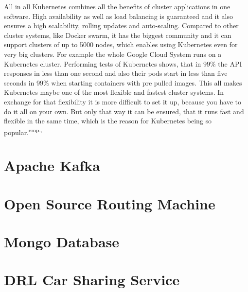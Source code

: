 All in all Kubernetes combines all the benefits of cluster applications in one software. High availability as well as load balancing is guaranteed and it also ensures a high scalability, rolling updates and auto-scaling. Compared to other cluster systems, like Docker swarm, it has the biggest community and it can support clusters of up to 5000 nodes, which enables using Kubernetes even for very big clusters. For example the whole Google Cloud System runs on a Kubernetes cluster. Performing tests of Kubernetes shows, that in 99\% the API responses in less than one second and also their pods start in less than five seconds in 99\% when starting containers with pre pulled images. This all makes Kubernetes maybe one of the most flexible and fastest cluster systems. In exchange for that flexibility it is more difficult to set it up, because you have to do it all on your own. But only that way it can be ensured, that it runs fast and flexible in the same time, which is the reason for Kubernetes being so popular.\textsuperscript{cmp.\cite{19}, \cite{20}}


\section{Apache Kafka}

\section{Open Source Routing Machine}

\section{Mongo Database}

\section{DRL Car Sharing Service}


